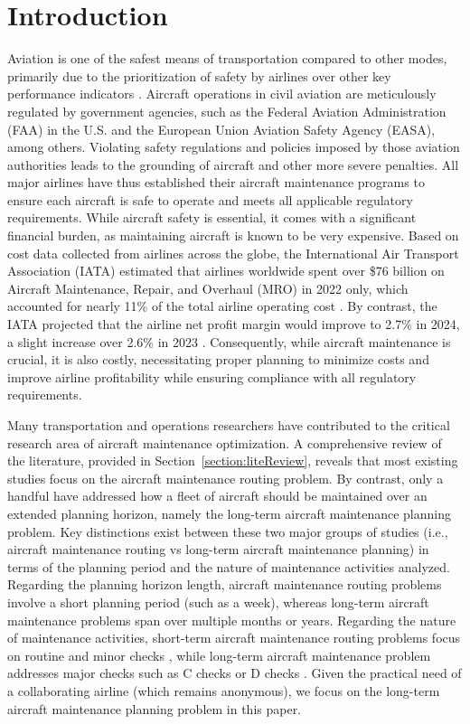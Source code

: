 \section{Introduction} 
Aviation is one of the safest means of transportation compared to other modes, primarily due to the prioritization of safety by airlines over other key performance indicators \citep{chen2024advancing}. Aircraft operations in civil aviation are meticulously regulated by government agencies, such as the Federal Aviation Administration (FAA) in the U.S. and the European Union Aviation Safety Agency (EASA), among others. Violating safety regulations and policies imposed by those aviation authorities leads to the grounding of aircraft and other more severe penalties. All major airlines have thus established their aircraft maintenance programs to ensure each aircraft is safe to operate and meets all applicable regulatory requirements. While aircraft safety is essential, it comes with a significant financial burden, as maintaining aircraft is known to be very expensive.
Based on cost data collected from airlines across the globe, the International Air Transport Association (IATA) estimated that airlines worldwide spent over \$76 billion on Aircraft Maintenance, Repair, and Overhaul (MRO) in 2022 only, which accounted for nearly 11\% of the total airline operating cost \citep{iata2022mcx}. By contrast, the IATA projected that the airline net profit margin would improve to 2.7\% in 2024, a slight increase over 2.6\% in 2023 \citep{iata2023pressrelease}.
Consequently, while aircraft maintenance is crucial, it is also costly, necessitating proper planning to minimize costs and improve airline profitability while ensuring compliance with all regulatory requirements.

Many transportation and operations researchers have contributed to the critical research area of aircraft maintenance optimization. A comprehensive review of the literature, provided in Section~\ref{section:liteReview}, reveals that most existing studies focus on the aircraft maintenance routing problem. By contrast, only a handful have addressed how a fleet of aircraft should be maintained over an extended planning horizon, namely the long-term aircraft maintenance planning problem.
Key distinctions exist between these two major groups of studies (i.e., aircraft maintenance routing vs long-term aircraft maintenance planning) in terms of the planning period and the nature of maintenance activities analyzed. 
Regarding the planning horizon length, aircraft maintenance routing problems involve a short planning period (such as a week), whereas long-term aircraft maintenance problems span over multiple months or years. Regarding the nature of maintenance activities, short-term aircraft maintenance routing problems focus on routine and minor checks \citep{sriram2003optimization,liang2009aircraft}, while long-term aircraft maintenance problem addresses major checks such as C checks or D checks \citep{van2013aircraft}.
Given the practical need of a collaborating airline (which remains anonymous), we focus on the long-term aircraft maintenance planning problem in this paper.

